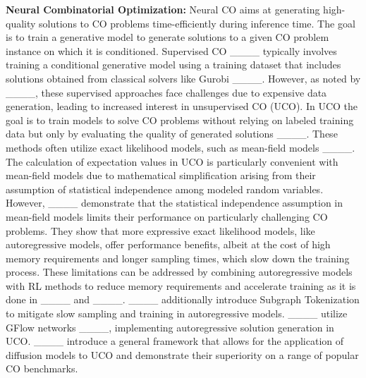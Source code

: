 \textbf{Neural Combinatorial Optimization:} Neural CO aims at generating high-quality solutions to CO problems time-efficiently during inference time.  The goal is to train a generative model to generate solutions to a given CO problem instance on which it is conditioned. Supervised CO ____ typically involves training a conditional generative model using a training dataset that includes solutions obtained from classical solvers like Gurobi ____.
However, as noted by ____, these supervised approaches face challenges due to expensive data generation, leading to increased interest in unsupervised CO (UCO). In UCO the goal is to train models to solve CO problems without relying on labeled training data but only by evaluating the quality of generated solutions ____. These methods often utilize exact likelihood models, such as mean-field models ____. The calculation of expectation values in UCO is particularly convenient with mean-field models due to mathematical simplification arising from their assumption of statistical independence among modeled random variables. However, ____ demonstrate that the statistical independence assumption in mean-field models limits their performance on particularly challenging CO problems. They show that more expressive exact likelihood models, like autoregressive models, offer performance benefits, albeit at the cost of high memory requirements and longer sampling times, which slow down the training process.
These limitations can be addressed by combining autoregressive models with RL methods to reduce memory requirements and accelerate training as it is done in ____ and ____. ____ additionally introduce Subgraph Tokenization to mitigate slow sampling and training in autoregressive models. ____ utilize GFlow networks ____, implementing autoregressive solution generation in UCO. ____ introduce a general framework that allows for the application of diffusion models to UCO and demonstrate their superiority on a range of popular CO benchmarks.


